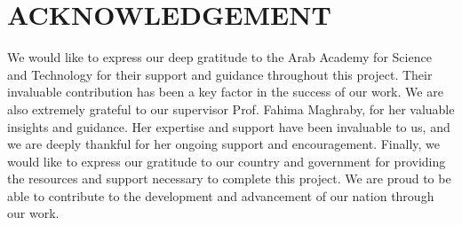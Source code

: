 \chapter*{ACKNOWLEDGEMENT}
\thispagestyle{plain}

\vspace{0.5cm}

We would like to express our deep gratitude to the Arab Academy for Science and Technology
for their support and guidance throughout this project. Their invaluable contribution has been a
key factor in the success of our work.
We are also extremely grateful to our supervisor Prof. Fahima Maghraby,
for her valuable insights and guidance. Her expertise and support have been invaluable to us,
and we are deeply thankful for her ongoing support and encouragement.
Finally, we would like to express our gratitude to our country and government for providing the
resources and support necessary to complete this project. We are proud to be able to contribute to
the development and advancement of our nation through our work.



\clearpage
